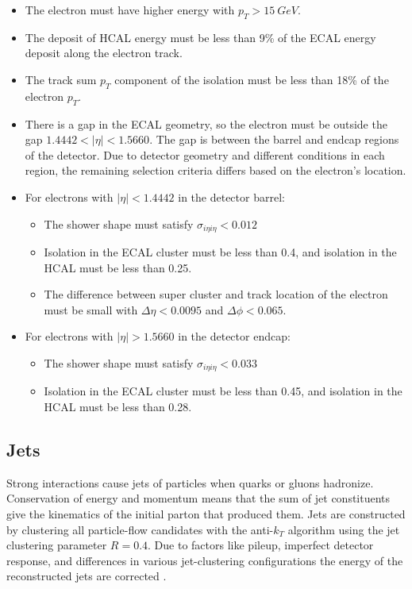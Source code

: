 \begin{itemize}
\item The electron must have higher energy with $p_T > \SI{15}{GeV}$.
\item The deposit of HCAL energy must be less than 9\% of the ECAL energy deposit
  along the electron track.
\item The track sum $p_T$ component of the isolation must be
  less than 18\% of the electron $p_T$.
\item There is a gap in the ECAL geometry,
  so the electron must be outside the gap $1.4442 < |\eta| < 1.5660$.
  The gap is between the barrel and endcap regions of the detector.
  Due to detector geometry and different conditions in each region,
  the remaining selection criteria differs based on the electron's location.
\item For electrons with $|\eta| < 1.4442$ in the detector barrel:
  \begin{itemize}
  \item The shower shape must satisfy $\sigma_{i\eta i\eta} < 0.012$
  \item Isolation in the ECAL cluster must be less than 0.4,
    and isolation in the HCAL must be less than 0.25.
  \item The difference between super cluster and track location of the electron
    must be small with $\Delta \eta < 0.0095$ and $\Delta \phi < 0.065$.
  \end{itemize}
\item For electrons with $|\eta| > 1.5660$ in the detector endcap:
  \begin{itemize}
  \item The shower shape must satisfy $\sigma_{i\eta i\eta} < 0.033$
  \item Isolation in the ECAL cluster must be less than 0.45,
    and isolation in the HCAL must be less than 0.28.
  \end{itemize}
\end{itemize}

\subsection{Jets} \label{sec:jets-def}

Strong interactions cause jets of particles when quarks or gluons hadronize.
Conservation of energy and momentum means that the sum of jet constituents
give the kinematics of the initial parton that produced them.
Jets are constructed by clustering all particle-flow candidates
with the anti-$k_T$ algorithm \cite{Cacciari_2008}
using the jet clustering parameter $R = 0.4$.
Due to factors like pileup, imperfect detector response, and differences in various jet-clustering
configurations the energy of the reconstructed jets are corrected \cite{Khachatryan_2017}.

